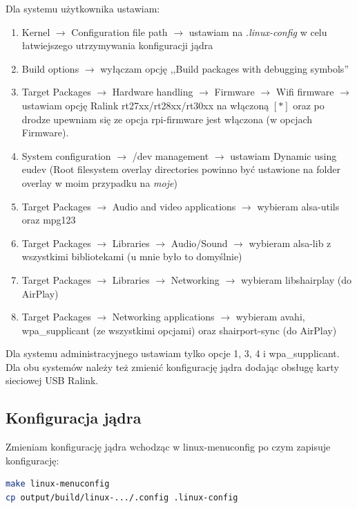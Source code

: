 Dla systemu użytkownika ustawiam:
\begin{enumerate}
\item Kernel $\rightarrow$ Configuration file path $\rightarrow$ ustawiam na \emph{.linux-config} w celu łatwiejszego utrzymywania konfiguracji jądra
\item Build options $\rightarrow$ wyłączam opcję ,,Build packages with debugging symbols''
\item Target Packages $\rightarrow$ Hardware handling $\rightarrow$ Firmware $\rightarrow$ Wifi firmware $\rightarrow$ ustawiam opcję Ralink rt27xx/rt28xx/rt30xx na włączoną $[*]$ oraz po drodze upewniam się ze opcja rpi-firmware jest włączona (w opcjach Firmware).
\item System configuration $\rightarrow$ /dev management $\rightarrow$ ustawiam Dynamic using eudev (Root filesystem overlay directories powinno być ustawione na folder overlay w moim przypadku na \emph{moje})
\item Target Packages $\rightarrow$ Audio and video applications $\rightarrow$ wybieram alsa-utils oraz mpg123 
\item Target Packages $\rightarrow$ Libraries $\rightarrow$ Audio/Sound $\rightarrow$ wybieram alsa-lib z wszystkimi bibliotekami (u mnie było to domyślnie)
\item Target Packages $\rightarrow$ Libraries $\rightarrow$ Networking $\rightarrow$ wybieram libshairplay (do AirPlay)
\item Target Packages $\rightarrow$ Networking applications $\rightarrow$ wybieram avahi, wpa\_supplicant (ze wszystkimi opcjami) oraz shairport-sync (do AirPlay)
\end{enumerate}

Dla systemu administracyjnego ustawiam tylko opcje 1, 3, 4 i wpa\_supplicant.
Dla obu systemów należy też zmienić konfigurację jądra dodając obsługę karty sieciowej USB Ralink.

\subsection{Konfiguracja jądra}
Zmieniam konfigurację jądra wchodząc w linux-menuconfig po czym zapisuje konfigurację:
\begin{lstlisting}[language=bash]
make linux-menuconfig
cp output/build/linux-.../.config .linux-config
\end{lstlisting}	


